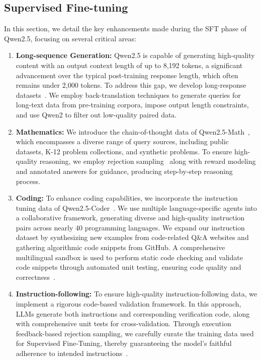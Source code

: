 \subsection{Supervised Fine-tuning}


In this section, we detail the key enhancements made during the SFT phase of Qwen2.5, focusing on several critical areas:


\begin{enumerate}[label=(\arabic*)]

    \item \textbf{Long-sequence Generation:} 
    Qwen2.5 is capable of generating high-quality content with an output context length of up to 8,192 tokens, a significant advancement over the typical post-training response length, which often remains under 2,000 tokens. To address this gap, we develop long-response datasets~\citep{quan2024language}. We employ back-translation techniques to generate queries for long-text data from pre-training corpora, impose output length constraints, and use Qwen2 to filter out low-quality paired data.

    \item \textbf{Mathematics:} 
    We introduce the chain-of-thought data of Qwen2.5-Math~\citep{qwen2.5math}, which encompasses a diverse range of query sources, including public datasets, K-12 problem collections, and synthetic problems. To ensure high-quality reasoning, we employ rejection sampling~\citep{yuan2023scaling} along with reward modeling and annotated answers for guidance, producing step-by-step reasoning process.

    \item \textbf{Coding:} 
    To enhance coding capabilities, we incorporate the instruction tuning data of Qwen2.5-Coder~\citep{qwen2.5coder}. We use multiple language-specific agents into a collaborative framework, generating diverse and high-quality instruction pairs across nearly 40 programming languages. 
    We expand our instruction dataset by synthesizing new examples from code-related Q\&A websites and gathering algorithmic code snippets from GitHub. A comprehensive multilingual sandbox is used to perform static code checking and validate code snippets through automated unit testing, ensuring code quality and correctness~\citep{dou2024multi,yang2024evaluating}.
    
    \item \textbf{Instruction-following: } 
    To ensure high-quality instruction-following data, we implement a rigorous code-based validation framework. In this approach, LLMs generate both instructions and corresponding verification code, along with comprehensive unit tests for cross-validation. Through execution feedback-based rejection sampling, we carefully curate the training data used for Supervised Fine-Tuning, thereby guaranteeing the model's faithful adherence to intended instructions~\citep{dong2024autoif}.
    

\end{enumerate}
